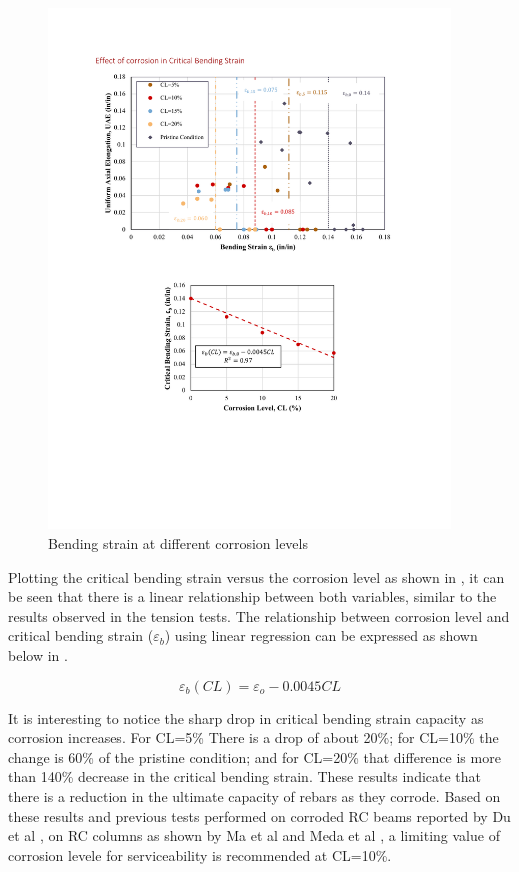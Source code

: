 \begin{figure}[htbp]
	\centering
	\includegraphics[width=0.95\textwidth]{VAC Thesis 2.0/Chapter-4/figs/BBT_results_.pdf}
	\caption{Bending strain at different corrosion levels}
	\label{fig:BBT_strains}
\end{figure}

Plotting the critical bending strain versus the corrosion level as shown in , it can be seen that there is a linear relationship between both variables, similar to the results observed in the tension tests. The relationship between corrosion level and critical bending strain ($\varepsilon_{b}$) using linear regression can be expressed as shown below in .

\begin{equation}
    \varepsilon_{b}(CL) = \varepsilon_{o}-0.0045CL
    \label{eq.Calderon_eb_vs_CL}
\end{equation}

It is interesting to notice the sharp drop in critical bending strain capacity as corrosion increases. For CL=5\% There is a drop of about 20\%; for CL=10\% the change is 60\% of the pristine condition; and for CL=20\% that difference is more than 140\% decrease in the critical bending strain. These results indicate that there is a reduction in the ultimate capacity of rebars as they corrode. Based on these results and previous tests performed on corroded RC beams reported by Du et al \cite{Du2005}, on RC columns as shown by Ma et al \cite{Ma2012} and Meda et al \cite{Meda2014}, a limiting value of corrosion levele for serviceability is recommended at CL=10\%.

